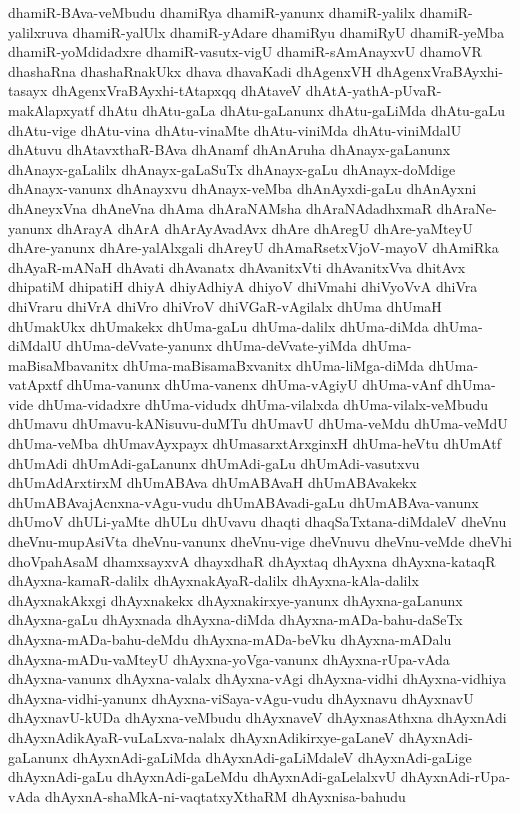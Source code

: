 {dhamiR-BAva-veMbudu
dhamiRya
dhamiR-yanunx
dhamiR-yalilx
dhamiR-yalilxruva
dhamiR-yalUlx
dhamiR-yAdare
dhamiRyu
dhamiRyU
dhamiR-yeMba
dhamiR-yoMdidadxre
dhamiR-vasutx-vigU
dhamiR-sAmAnayxvU
dhamoVR
dhashaRna
dhashaRnakUkx
dhava
dhavaKadi
dhAgenxVH
dhAgenxVraBAyxhi-tasayx
dhAgenxVraBAyxhi-tAtapxqq
dhAtaveV
dhAtA-yathA-pUvaR-makAlapxyatf
dhAtu
dhAtu-gaLa
dhAtu-gaLanunx
dhAtu-gaLiMda
dhAtu-gaLu
dhAtu-vige
dhAtu-vina
dhAtu-vinaMte
dhAtu-viniMda
dhAtu-viniMdalU
dhAtuvu
dhAtavxthaR-BAva
dhAnamf
dhAnAruha
dhAnayx-gaLanunx
dhAnayx-gaLalilx
dhAnayx-gaLaSuTx
dhAnayx-gaLu
dhAnayx-doMdige
dhAnayx-vanunx
dhAnayxvu
dhAnayx-veMba
dhAnAyxdi-gaLu
dhAnAyxni
dhAneyxVna
dhAneVna
dhAma
dhAraNAMsha
dhAraNAdadhxmaR
dhAraNe-yanunx
dhArayA
dhArA
dhArAyAvadAvx
dhAre
dhAregU
dhAre-yaMteyU
dhAre-yanunx
dhAre-yalAlxgali
dhAreyU
dhAmaRsetxVjoV-mayoV
dhAmiRka
dhAyaR-mANaH
dhAvati
dhAvanatx
dhAvanitxVti
dhAvanitxVva
dhitAvx
dhipatiM
dhipatiH
dhiyA
dhiyAdhiyA
dhiyoV
dhiVmahi
dhiVyoVvA
dhiVra
dhiVraru
dhiVrA
dhiVro
dhiVroV
dhiVGaR-vAgilalx
dhUma
dhUmaH
dhUmakUkx
dhUmakekx
dhUma-gaLu
dhUma-dalilx
dhUma-diMda
dhUma-diMdalU
dhUma-deVvate-yanunx
dhUma-deVvate-yiMda
dhUma-maBisaMbavanitx
dhUma-maBisamaBxvanitx
dhUma-liMga-diMda
dhUma-vatApxtf
dhUma-vanunx
dhUma-vanenx
dhUma-vAgiyU
dhUma-vAnf
dhUma-vide
dhUma-vidadxre
dhUma-vidudx
dhUma-vilalxda
dhUma-vilalx-veMbudu
dhUmavu
dhUmavu-kANisuvu-duMTu
dhUmavU
dhUma-veMdu
dhUma-veMdU
dhUma-veMba
dhUmavAyxpayx
dhUmasarxtArxginxH
dhUma-heVtu
dhUmAtf
dhUmAdi
dhUmAdi-gaLanunx
dhUmAdi-gaLu
dhUmAdi-vasutxvu
dhUmAdArxtirxM
dhUmABAva
dhUmABAvaH
dhUmABAvakekx
dhUmABAvajAcnxna-vAgu-vudu
dhUmABAvadi-gaLu
dhUmABAva-vanunx
dhUmoV
dhULi-yaMte
dhULu
dhUvavu
dhaqti
dhaqSaTxtana-diMdaleV
dheVnu
dheVnu-mupAsiVta
dheVnu-vanunx
dheVnu-vige
dheVnuvu
dheVnu-veMde
dheVhi
dhoVpahAsaM
dhamxsayxvA
dhayxdhaR
dhAyxtaq
dhAyxna
dhAyxna-kataqR
dhAyxna-kamaR-dalilx
dhAyxnakAyaR-dalilx
dhAyxna-kAla-dalilx
dhAyxnakAkxgi
dhAyxnakekx
dhAyxnakirxye-yanunx
dhAyxna-gaLanunx
dhAyxna-gaLu
dhAyxnada
dhAyxna-diMda
dhAyxna-mADa-bahu-daSeTx
dhAyxna-mADa-bahu-deMdu
dhAyxna-mADa-beVku
dhAyxna-mADalu
dhAyxna-mADu-vaMteyU
dhAyxna-yoVga-vanunx
dhAyxna-rUpa-vAda
dhAyxna-vanunx
dhAyxna-valalx
dhAyxna-vAgi
dhAyxna-vidhi
dhAyxna-vidhiya
dhAyxna-vidhi-yanunx
dhAyxna-viSaya-vAgu-vudu
dhAyxnavu
dhAyxnavU
dhAyxnavU-kUDa
dhAyxna-veMbudu
dhAyxnaveV
dhAyxnasAthxna
dhAyxnAdi
dhAyxnAdikAyaR-vuLaLxva-nalalx
dhAyxnAdikirxye-gaLaneV
dhAyxnAdi-gaLanunx
dhAyxnAdi-gaLiMda
dhAyxnAdi-gaLiMdaleV
dhAyxnAdi-gaLige
dhAyxnAdi-gaLu
dhAyxnAdi-gaLeMdu
dhAyxnAdi-gaLelalxvU
dhAyxnAdi-rUpa-vAda
dhAyxnA-shaMkA-ni-vaqtatxyXthaRM
dhAyxnisa-bahudu
}
